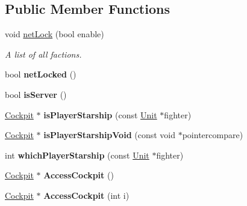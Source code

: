\subsection*{Public Member Functions}
\begin{DoxyCompactItemize}
\item 
void \hyperlink{classUniverse_abc0e3733e0a2bb96c490e0034a17f687}{net\+Lock} (bool enable)\hypertarget{classUniverse_abc0e3733e0a2bb96c490e0034a17f687}{}\label{classUniverse_abc0e3733e0a2bb96c490e0034a17f687}

\begin{DoxyCompactList}\small\item\em A list of all factions. \end{DoxyCompactList}\item 
bool {\bfseries net\+Locked} ()\hypertarget{classUniverse_aedb1d50f6f8423606c4085a462e7927b}{}\label{classUniverse_aedb1d50f6f8423606c4085a462e7927b}

\item 
bool {\bfseries is\+Server} ()\hypertarget{classUniverse_a1952e70086caec8e5bb8fa180a1ddaac}{}\label{classUniverse_a1952e70086caec8e5bb8fa180a1ddaac}

\item 
\hyperlink{classCockpit}{Cockpit} $\ast$ {\bfseries is\+Player\+Starship} (const \hyperlink{classUnit}{Unit} $\ast$fighter)\hypertarget{classUniverse_ad85aa0c647897986ed2e3344f200ca39}{}\label{classUniverse_ad85aa0c647897986ed2e3344f200ca39}

\item 
\hyperlink{classCockpit}{Cockpit} $\ast$ {\bfseries is\+Player\+Starship\+Void} (const void $\ast$pointercompare)\hypertarget{classUniverse_a3156f148ffbb90f1beb988bbfd386095}{}\label{classUniverse_a3156f148ffbb90f1beb988bbfd386095}

\item 
int {\bfseries which\+Player\+Starship} (const \hyperlink{classUnit}{Unit} $\ast$fighter)\hypertarget{classUniverse_a2aac72dec5c5c305c26e9497fb9d1a67}{}\label{classUniverse_a2aac72dec5c5c305c26e9497fb9d1a67}

\item 
\hyperlink{classCockpit}{Cockpit} $\ast$ {\bfseries Access\+Cockpit} ()\hypertarget{classUniverse_a53fb43f8c8af4f517d2f735c11507036}{}\label{classUniverse_a53fb43f8c8af4f517d2f735c11507036}

\item 
\hyperlink{classCockpit}{Cockpit} $\ast$ {\bfseries Access\+Cockpit} (int i)\hypertarget{classUniverse_a6d7994f68e240e98235b246185eabfeb}{}\label{classUniverse_a6d7994f68e240e98235b246185eabfeb}


\end{DoxyCompactItemize}

